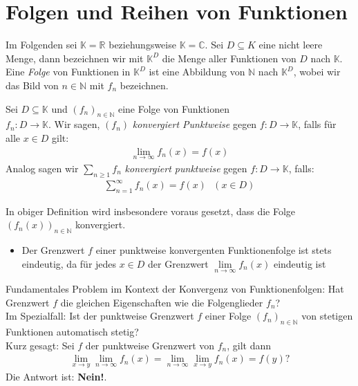 \section{Folgen und Reihen von Funktionen}
Im Folgenden sei $\mathbb{K} = \mathbb{R}$ beziehungsweise $\mathbb{K} = \mathbb{C}$. Sei $D \subseteq K$ eine nicht leere Menge, dann bezeichnen wir mit $\mathbb{K}^D $ die Menge aller Funktionen von $D$ nach $\mathbb{K}$. \\
Eine \emph{Folge} von Funktionen in $\mathbb{K}^D$ ist eine Abbildung von $\mathbb{N}$ nach $\mathbb{K}^D$, wobei wir das Bild von $n \in \mathbb{N}$ mit 
$f_n$ bezeichnen.

\begin{Definition}{
	Sei $D \subseteq \mathbb{K}$ und $(f_n)_{n \in \mathbb{N}}$ eine Folge von 
	Funktionen \\
	$f_n : D \rightarrow \mathbb{K}$. Wir sagen, $(f_n)$ \emph{konvergiert 
	Punktweise} gegen $f:D \rightarrow \mathbb{K}$, falls für alle $x \in D$ gilt:
	\begin{align*}
		\lim \limits_{n \rightarrow \infty}{f_n(x) =f(x)}
	\end{align*}
	Analog sagen wir $\sum_{n\geq 1} f_n$ \emph{konvergiert punktweise} gegen 
	$f: D \rightarrow \mathbb{K}$, falls:
	\begin{align*}
		\sum_{n = 1}^{\infty} f_n(x) = f(x) \text{ } (x \in D)
	\end{align*}
}\end{Definition}

\begin{Bemerkung}{
	In obiger Definition wird insbesondere voraus gesetzt, dass die Folge $(f_n(x))_
	{n \in \mathbb{N}}$ konvergiert.
	\begin{itemize}
		\item Der Grenzwert $f$ einer punktweise konvergenten Funktionenfolge ist 
		stets eindeutig, da für jedes $x \in D$ der Grenzwert 
		$\lim\limits_{n \rightarrow \infty} f_n(x)$ eindeutig ist
	\end{itemize}
	Fundamentales Problem im Kontext der Konvergenz von Funktionenfolgen:
	\glqq Hat Grenzwert $f$ die \glqq gleichen\grqq{} Eigenschaften wie die 
	Folgenglieder $f_n$?\grqq{} \\
	Im Spezialfall: Ist der punktweise Grenzwert $f$ einer Folge $(f_n)_{n \in 
	\mathbb{N}}$ von stetigen Funktionen automatisch stetig? \\
	Kurz gesagt: Sei $f$ der punktweise Grenzwert von $f_n$, gilt dann 
	\begin{align*}
		\lim\limits_{x \rightarrow y}{\lim \limits_{n \rightarrow \infty}{f_n(x)}}
		= \lim\limits_{n \rightarrow \infty}{\lim\limits_{x \rightarrow y}{f_n(x)} }
		= f(y) ?
	\end{align*}
	Die Antwort ist: \textbf{Nein!}.
}\end{Bemerkung}

